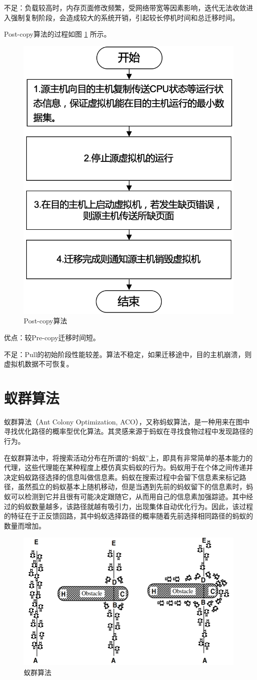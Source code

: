 不足：负载较高时，内存页面修改频繁，受网络带宽等因素影响，迭代无法收敛进入强制复制阶段，会造成较大的系统开销，引起较长停机时间和总迁移时间。

Post-copy算法的过程如图 \ref{Fig:chap2_3} 所示。

\begin{figure}[!htb]
  \centering
  \includegraphics[width=0.3\linewidth]{./Figure/IMG_Chap2_3.png}
  \caption{Post-copy算法}\label{Fig:chap2_3}
\end{figure}

优点：较Pre-copy迁移时间短。

不足：Pull的初始阶段性能较差。算法不稳定，如果迁移途中，目的主机崩溃，则虚拟机数据不可恢复。

\section{蚁群算法}
蚁群算法（Ant Colony Optimization, ACO），又称蚂蚁算法，是一种用来在图中寻找优化路径的概率型优化算法。其灵感来源于蚂蚁在寻找食物过程中发现路径的行为\cite{Maniezzo}。

在蚁群算法中，将搜索活动分布在所谓的“蚂蚁”上，即具有非常简单的基本能力的代理，这些代理能在某种程度上模仿真实蚂蚁的行为。蚂蚁用于在个体之间传递并决定蚂蚁路径选择的信息叫做信息素。蚂蚁在搜索过程中会留下信息素来标记路径，虽然孤立的蚂蚁基本上随机移动，但是当遇到先前的蚂蚁留下的信息素时，蚂蚁可以检测到它并且很有可能决定跟随它，从而用自己的信息素加强踪迹。其中经过的蚂蚁数量越多，该路径就越有吸引力，出现集体自动优化行为。因此，该过程的特征在于正反馈回路，其中蚂蚁选择路径的概率随着先前选择相同路径的蚂蚁的数量而增加。

\begin{figure}[!htb]
  \centering
  \includegraphics{./Figure/IMG_Chap2_4.png}
  \caption{蚁群算法}\label{Fig:chap2_4}
\end{figure}

